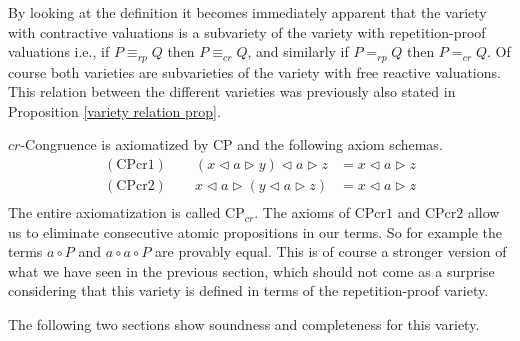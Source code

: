 \documentclass[a4paper,twoside,openright]{report}
\newcommand{\CPcr}[1]{\ensuremath{\mathrm{CPcr#1}}}
\newcommand{\lef}{\ensuremath{\triangleleft}}
\newcommand{\rig}{\ensuremath{\triangleright}}
\begin{document}
By looking at the definition it becomes immediately apparent that the variety with contractive valuations is a subvariety of the variety with repetition-proof valuations i.e., if $P\equiv_{rp}Q$ then $P\equiv_{cr}Q$, and similarly if $P=_{rp}Q$ then $P=_{cr}Q$. Of course both varieties are subvarieties of the variety with free reactive valuations. This relation between the different varieties was previously also stated in Proposition \ref{variety relation prop}.

$cr$-Congruence is axiomatized by CP and the following axiom schemas.
\begin{align*}
(\CPcr1)\qquad(x\lef a\rig y)\lef a\rig z &= x\lef a\rig z\\
(\CPcr2)\qquad x\lef a\rig (y\lef a\rig z) &= x\lef a\rig z\\
\end{align*}
The entire axiomatization is called $\text{CP}_{cr}$. The axioms of \CPcr1 and \CPcr2 allow us to eliminate consecutive atomic propositions in our terms. So for example the terms $a\circ P$ and $a\circ a\circ P$ are provably equal. This is of course a stronger version of what we have seen in the previous section, which should not come as a surprise considering that this variety is defined in terms of the repetition-proof variety.



The following two sections show soundness and completeness for this variety.
\end{document}
